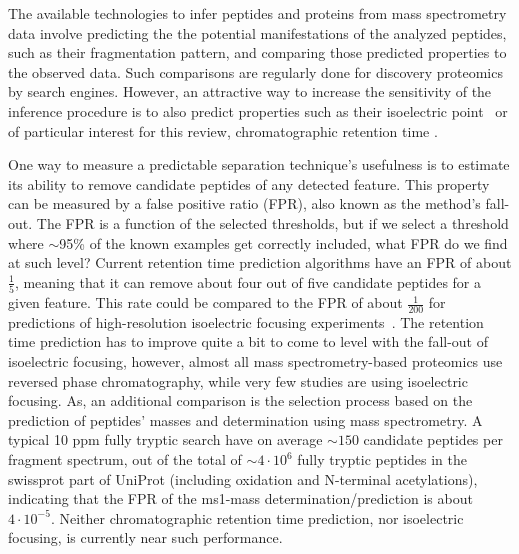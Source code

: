 \documentclass[a4paper]{article}
\begin{document}
The available technologies to infer peptides and proteins from mass
spectrometry data involve predicting the the potential manifestations
of the analyzed peptides, such as their fragmentation pattern, and
comparing those predicted properties to the observed data. Such
comparisons are regularly done for discovery proteomics by search
engines. However, an attractive way to increase the sensitivity of the
inference procedure is to also predict properties such as their
isoelectric point~\cite{perez2011silico,branca2014hirief} or of
particular interest for this review, chromatographic retention time
\cite{cerqueira2010mude}. 

One way to measure a predictable separation technique's usefulness is
to estimate its ability to remove candidate peptides of any detected
feature. This property can be measured by a false positive ratio
(FPR), also known as the method's fall-out. The FPR is a function of
the selected thresholds, but if we select a threshold where $\sim$95\%
of the known examples get correctly included, what FPR do we find at
such level?  Current retention time prediction algorithms have an FPR
of about $\frac{1}{5}$, meaning that it can remove about four out of
five candidate peptides for a given feature. This rate could be
compared to the FPR of about $\frac{1}{200}$ for predictions of
high-resolution isoelectric focusing
experiments~\cite{branca2014hirief}. The retention time prediction has
to improve quite a bit to come to level with the fall-out of
isoelectric focusing, however, almost all mass spectrometry-based
proteomics use reversed phase chromatography, while very few studies
are using isoelectric focusing. As, an additional comparison is the
selection process based on the prediction of peptides' masses and
determination using mass spectrometry. A typical 10 ppm fully tryptic
search have on average $\sim 150$ candidate peptides per fragment
spectrum, out of the total of $\sim 4\cdot 10^6$ fully tryptic
peptides in the swissprot part of UniProt (including oxidation and
N-terminal acetylations), indicating that the FPR of the ms1-mass
determination/prediction is about $4\cdot 10^{-5}$. Neither
chromatographic retention time prediction, nor isoelectric focusing,
is currently near such performance.
\end{document}
